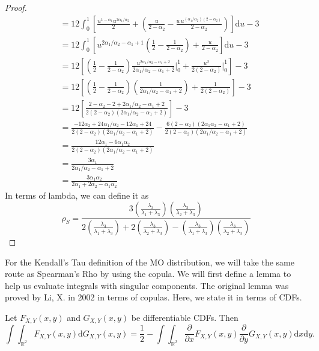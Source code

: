 \begin{proof}
\begin{align*}
        &=12\int_0^1\left[\frac{u^{1-\alpha_1}u^{2\alpha_1/\alpha_2}}{2}+\left(\frac{u}{2-\alpha_2}-\frac{u\, u^{\left(\alpha_1/\alpha_2\right)\left(2-\alpha_2\right)}}{2-\alpha_2}\right)\right]\mathrm{d}u-3\\
        &=12\int_0^1\left[u^{2\alpha_1/\alpha_2-\alpha_1+1}\left(\frac{1}{2}-\frac{1}{2-\alpha_2}\right)+\frac{u}{2-\alpha_2}\right]\mathrm{d}u-3\\
        &=12\left[\left(\frac{1}{2}-\frac{1}{2-\alpha_2}\right)\frac{u^{2\alpha_1/\alpha_2-\alpha_1+2}}{2\alpha_1/\alpha_2-\alpha_1+2}\bigg|_0^1+\frac{u^2}{2\left(2-\alpha_2\right)}\bigg|_0^1\right]-3\\
        &=12\left[\left(\frac{1}{2}-\frac{1}{2-\alpha_2}\right)\left(\frac{1}{2\alpha_1/\alpha_2-\alpha_1+2}\right)+\frac{1}{2\left(2-\alpha_2\right)}\right]-3\\
        &=12\left[\frac{2-\alpha_2-2+2\alpha_1/\alpha_2-\alpha_1+2}{2\left(2-\alpha_2\right)\left(2\alpha_1/\alpha_2-\alpha_1+2\right)}\right]-3\\
        &=\frac{-12\alpha_2+24\alpha_1/\alpha_2-12\alpha_1+24}{2\left(2-\alpha_2\right)\left(2\alpha_1/\alpha_2-\alpha_1+2\right)}-\frac{6\left(2-\alpha_2\right)\left(2\alpha_1\alpha_2-\alpha_1+2\right)}{2\left(2-\alpha_2\right)\left(2\alpha_1/\alpha_2-\alpha_1+2\right)}\\
        &=\frac{12\alpha_1-6\alpha_1\alpha_2}{2\left(2-\alpha_2\right)\left(2\alpha_1/\alpha_2-\alpha_1+2\right)}\\
        &=\frac{3\alpha_1}{2\alpha_1/\alpha_2-\alpha_1+2}\\
        &=\frac{3\alpha_1\alpha_2}{2\alpha_1+2\alpha_2-\alpha_1\alpha_2}
    \end{align*}
    In terms of lambda, we can define it as $$\rho_S=\frac{3\left(\frac{\lambda_3}{\lambda_1+\lambda_3}\right)\left(\frac{\lambda_3}{\lambda_2+\lambda_3}\right)}{2\left(\frac{\lambda_3}{\lambda_1+\lambda_3}\right)+2\left(\frac{\lambda_3}{\lambda_2+\lambda_3}\right)-\left(\frac{\lambda_3}{\lambda_1+\lambda_3}\right)\left(\frac{\lambda_3}{\lambda_2+\lambda_3}\right)}$$
\end{proof}
For the Kendall's Tau definition of the MO distribution, we will take the same route as Spearman's Rho by using the copula. We will first define a lemma to help us evaluate integrals with singular components. The original lemma was proved by Li, X. in 2002 \cite{li2002} in terms of copulas. Here, we state it in terms of CDFs.
\begin{lemma}\label{lem:li}
    Let $F_{X,Y}\left(x,y\right)$ and $G_{X,Y}\left(x,y\right)$ be differentiable CDFs. Then $$\int\int_{\mathbb{R}^2}F_{X,Y}\left(x,y\right)\mathrm{d}G_{X,Y}\left(x,y\right)=\frac{1}{2}-\int\int_{\mathbb{R}^2}\frac{\partial}{\partial x}F_{X,Y}\left(x,y\right)\frac{\partial}{\partial y}G_{X,Y}\left(x,y\right)\mathrm{d}x\mathrm{d}y.$$
\end{lemma}
